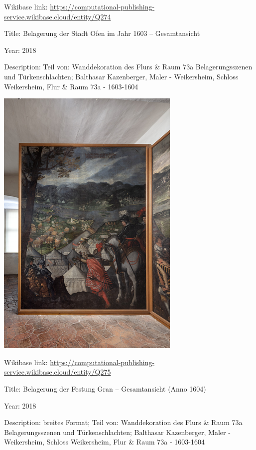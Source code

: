 \documentclass[
  letterpaper,
]{book}
\begin{document}
Wikibase link:
\url{https://computational-publishing-service.wikibase.cloud/entity/Q274}

Title: Belagerung der Stadt Ofen im Jahr 1603 -- Gesamtansicht

Year: 2018

Description: Teil von: Wanddekoration des Flurs \& Raum 73a
Belagerungsszenen und Türkenschlachten; Balthasar Kazenberger, Maler -
Weikersheim, Schloss Weikersheim, Flur \& Raum 73a - 1603-1604

\includegraphics{paintings_files/figure-pdf/cell-3-output-40.png}

Wikibase link:
\url{https://computational-publishing-service.wikibase.cloud/entity/Q275}

Title: Belagerung der Festung Gran -- Gesamtansicht (Anno 1604)

Year: 2018

Description: breites Format; Teil von: Wanddekoration des Flurs \& Raum
73a Belagerungsszenen und Türkenschlachten; Balthasar Kazenberger, Maler
- Weikersheim, Schloss Weikersheim, Flur \& Raum 73a - 1603-1604
\end{document}
